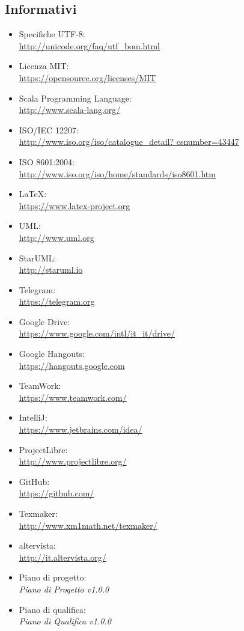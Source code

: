 \documentclass[a4paper]{report}
\begin{document}
		\subsection{Informativi}
			\begin{itemize}
				\item Specifiche UTF-8: \\ \url{http://unicode.org/faq/utf_bom.html}
				\item Licenza MIT: \\ \url{https://opensource.org/licenses/MIT}
				\item Scala Programming Language: \\ \url{http://www.scala-lang.org/}
				\item ISO/IEC 12207: \\ \url{http://www.iso.org/iso/catalogue_detail?
				csnumber=43447}
				\item ISO 8601:2004: \\ \url{http://www.iso.org/iso/home/standards/iso8601.htm}
				\item \LaTeX: \\ \url{https://www.latex-project.org}
				\item UML: \\ \url{http://www.uml.org}
				\item StarUML: \\ \url{http://staruml.io}
				\item Telegram: \\ \url{https://telegram.org}
				\item Google Drive: \\ \url{https://www.google.com/intl/it_it/drive/}
				\item Google Hangouts: \\ \url{https://hangouts.google.com}
				\item TeamWork: \\ \url{https://www.teamwork.com/}
				\item IntelliJ: \\ \url{https://www.jetbrains.com/idea/}
				\item ProjectLibre: \\ \url{http://www.projectlibre.org/}
				\item GitHub: \\ \url{https://github.com/}
				\item Texmaker: \\ \url{http://www.xm1math.net/texmaker/}
				\item altervista: \\ \url{http://it.altervista.org/}
				\item Piano di progetto: \\ \emph{Piano di Progetto v1.0.0}
				\item Piano di qualifica: \\ \emph{Piano di Qualifica v1.0.0}
			\end{itemize}
\end{document}

